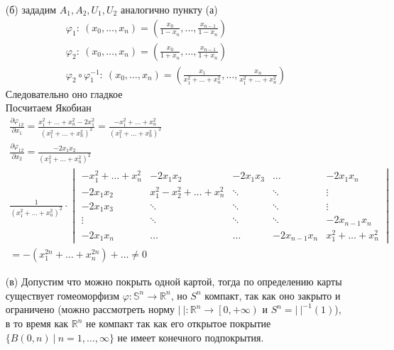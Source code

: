 \begin{enumerate}
	\item[(б)]
		зададим $A_1, A_2, U_1, U_2$ аналогично пункту (а)
		\begin{gather*}
			\varphi_1:\ (x_0, \ldots, x_n) = \left(\frac{x_0}{1-x_n},\ldots,\frac{x_{n-1}}{1-x_n}\right)\\
			\varphi_2:\ (x_0, \ldots, x_n) = \left(\frac{x_0}{1+x_n},\ldots,\frac{x_{n-1}}{1+x_n}\right)\\
			\varphi_2 \circ \varphi_1^{-1}:\ (x_0, \ldots, x_n) = \left(\frac{x_1}{x_1^2 + \ldots + x_n^2},\ldots,\frac{x_{n}}{x_1^2 + \ldots + x_n^2}\right)
		\end{gather*}
		Следовательно оно гладкое\\
		Посчитаем Якобиан
		\begin{gather*}
			\frac{\partial \varphi_{12}}{\partial x_1} = \frac{x_1^2 + \ldots + x_n^2 - 2x_1^2}{(x_1^2 + \ldots + x_n^2)^2} = \frac{-x_1^2 + \ldots + x_n^2}{(x_1^2 + \ldots + x_n^2)^2}\\
			\frac{\partial \varphi_{12}}{\partial x_2} = \frac{-2x_1x_2}{(x_1^2 + \ldots + x_n^2)^2}\\
			\frac{1}{(x_1^2 + \ldots + x_n^2)^2} \cdot
			\begin{vmatrix}
				-x_1^2 + \ldots + x_n^2 & -2x_1x_2 & -2x_1x_3 & \ldots & -2x_1x_n\\
				-2x_1x_2 & x_1^2 - x_2^2 + \ldots + x_n^2 & \ddots & \ddots & \vdots\\
				-2x_1x_3 & \ddots & \ddots & \ddots & \vdots\\
				\vdots & \ddots & \ddots & \ddots & -2x_{n-1}x_n\\
				-2x_1x_n & \ldots & \ldots & -2x_{n-1}x_n & x_1^2 + \ldots + x_n^2
			\end{vmatrix}\\
			= 
			-(x_1^{2n} + \ldots + x_n^{2n}) + \ldots \ne 0
		\end{gather*}
	\item[(в)]
		Допустим что можно покрыть одной картой, тогда по определению карты существует гомеоморфизм $\varphi: \mathbb{S}^n \to \mathbb{R}^n$, но $S^n$ компакт, так как оно закрыто и ограничено (можно рассмотреть норму $|\ |: \mathbb{R}^n \to \left[0,+\infty \right)$ и $S^{n} = |\ |^{-1}(1)$), в то время как $\mathbb{R}^n$ не компакт так как его открытое покрытие $\{B(0, n)\ |\ n = 1, \ldots, \infty\}$ не имеет конечного подпокрытия.
\end{enumerate}


